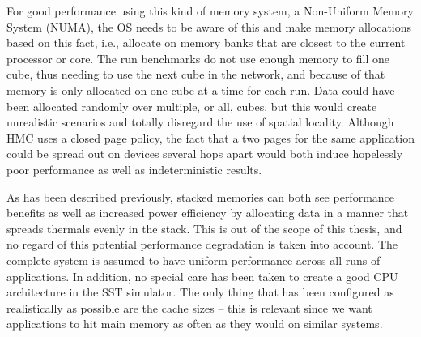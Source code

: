 For good performance using this kind of memory system, a Non-Uniform Memory System (NUMA), the OS needs to be aware of this and make memory allocations based on this fact, i.e., allocate on memory banks that are closest to the current processor or core. The run benchmarks do not use enough memory to fill one cube, thus needing to use the next cube in the network, and because of that memory is only allocated on one cube at a time for each run. Data could have been allocated randomly over multiple, or all, cubes, but this would create unrealistic scenarios and totally disregard the use of spatial locality. Although HMC uses a closed page policy, the fact that a two pages for the same application could be spread out on devices several hops apart would both induce hopelessly poor performance as well as indeterministic results.
\bigskip

As has been described previously, stacked memories can both see performance benefits as well as increased power efficiency by allocating data in a manner that spreads thermals evenly in the stack. This is out of the scope of this thesis, and no regard of this potential performance degradation is taken into account. The complete system is assumed to have uniform performance across all runs of applications. In addition, no special care has been taken to create a good CPU architecture in the SST simulator. The only thing that has been configured as realistically as possible are the cache sizes -- this is relevant since we want applications to hit main memory as often as they would on similar systems.

